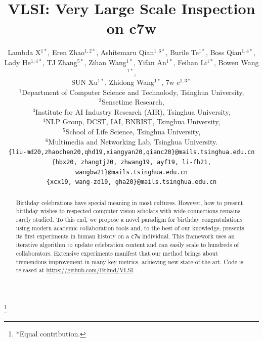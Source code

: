 \documentclass[10pt,twocolumn,letterpaper]{article}
\newcommand\blfootnote[1]{%
  \begingroup
  \renewcommand\thefootnote{}\footnote{#1}%
  \addtocounter{footnote}{-1}%
  \endgroup
}
\begin{document}
\title{VLSI: Very Large Scale Inspection on c7w}

\author{Lambda X$^{1*}$, Eren Zhao$^{1,2*}$, Ashitemaru Qian$^{1,6*}$, Burile Te$^{1*}$, Boss Qian$^{1,4*}$,\\
 Lady He$^{1, 4*}$, TJ Zhang$^{5*}$, Zihan Wang$^{1*}$, Yifan An$^{1*}$, Feihan Li$^{1*}$, Bowen Wang$^{1*}$,\\
SUN Xu$^{1*}$, Zhidong Wang$^{1*}$, 7w c$^{1,3*}$ \\
$^1$Department of Computer Science and Technolody, Tsinghua University, \\
$^2$Sensetime Research, \\
$^3$Institute for AI Industry Research (AIR), Tsinghua University, \\
$^4$NLP Group, DCST, IAI, BNRIST, Tsinghua University, \\
$^5$School of Life Science, Tsinghua University, \\
$^6$Multimedia and Networking Lab, Tsinghua University. \\
{\tt\small \{liu-md20,zhaochen20,qhd19,xiangyan20,qianc20\}@mails.tsinghua.edu.cn} \\
{\tt\small \{hbx20, zhangtj20, zhwang19, ayf19, li-fh21, wangbw21\}@mails.tsinghua.edu.cn} \\
{\tt\small \{xcx19,  wang-zd19, gha20\}@mails.tsinghua.edu.cn} \\
}
\maketitle

\begin{abstract}
Birthday celebrations have special meaning in most cultures. However, how to present birthday wishes to respected computer vision scholars with wide connections remains rarely studied. To this end, we propose a novel paradigm for birthday congratulations using modern academic collaboration tools and, to the best of our knowledge, presents its first experiments in human history on a \verb|c7w| individual. This framework uses an iterative algorithm to update celebration content and can easily scale to hundreds of collaborators. Extensive experiments manifest that our method brings about tremendous improvement in many key metrics, achieving new state-of-the-art. Code is released at \url{https://github.com/Btlmd/VLSI}.
\end{abstract}
\blfootnote{*Equal contribution.}
\end{document}
